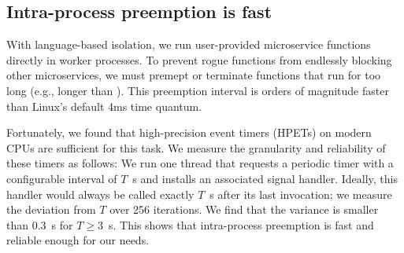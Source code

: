\subsection{Intra-process preemption is fast}
With language-based isolation, we run user-provided microservice functions
directly in worker processes. To prevent rogue functions from endlessly blocking
other microservices, we must premept or terminate functions that run for too
long (e.g., longer than ).  This preemption interval is orders of
magnitude faster than Linux's default 4ms time quantum.

Fortunately, we found that high-precision event timers (HPETs) on modern CPUs
are sufficient for this task. We measure the granularity and reliability of
these timers as follows: We run one thread that requests a periodic timer with a
configurable interval of $T$~\textmu{}s and installs an associated signal handler.
Ideally, this handler would always be called exactly $T$~\textmu{}s after its last
invocation; we measure the deviation from $T$ over 256 iterations.
We find that the variance
is smaller than 0.3~\textmu{}s for $T \ge 3$~\textmu{}s. This shows that
intra-process preemption is fast and reliable enough for our needs.
